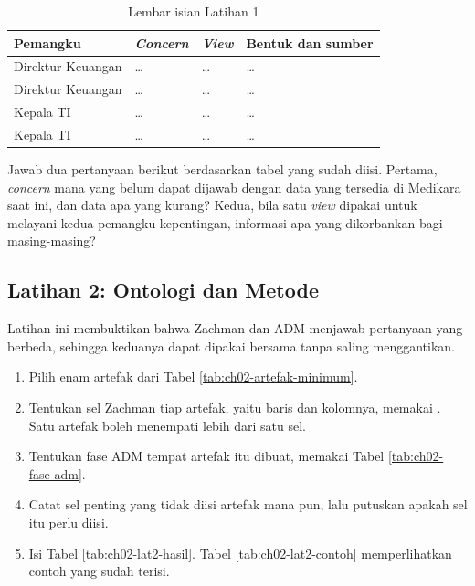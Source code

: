 \begin{table}[!htb]
  \centering
  \caption{Lembar isian Latihan 1}
  \label{tab:ch02-lat1-hasil}
  {\footnotesize
  \begin{tabularx}{\textwidth}{>{\raggedright\arraybackslash}p{2.0cm}
                               >{\raggedright\arraybackslash}X
                               >{\raggedright\arraybackslash}p{2.8cm}
                               >{\raggedright\arraybackslash}p{2.8cm}}
    \hline
    \textbf{Pemangku} & \textbf{\textit{Concern}} & \textbf{\textit{View}} & \textbf{Bentuk dan sumber} \\
    \hline
    Direktur Keuangan & \dots & \dots & \dots \\
    \hline
    Direktur Keuangan & \dots & \dots & \dots \\
    \hline
    Kepala TI & \dots & \dots & \dots \\
    \hline
    Kepala TI & \dots & \dots & \dots \\
    \hline
  \end{tabularx}}
\end{table}

Jawab dua pertanyaan berikut berdasarkan tabel yang sudah diisi. Pertama,
\textit{concern} mana yang belum dapat dijawab dengan data yang tersedia di
Medikara saat ini, dan data apa yang kurang? Kedua, bila satu \textit{view}
dipakai untuk melayani kedua pemangku kepentingan, informasi apa yang
dikorbankan bagi masing-masing?

\subsection*{Latihan 2: Ontologi dan Metode}

Latihan ini membuktikan bahwa Zachman dan ADM menjawab pertanyaan yang
berbeda, sehingga keduanya dapat dipakai bersama tanpa saling menggantikan.

\begin{enumerate}
  \item Pilih enam artefak dari Tabel \ref{tab:ch02-artefak-minimum}.
  \item Tentukan sel Zachman tiap artefak, yaitu baris dan kolomnya, memakai
        . Satu artefak
        boleh menempati lebih dari satu sel.
  \item Tentukan fase ADM tempat artefak itu dibuat, memakai
        Tabel \ref{tab:ch02-fase-adm}.
  \item Catat sel penting yang tidak diisi artefak mana pun, lalu putuskan
        apakah sel itu perlu diisi.
  \item Isi Tabel \ref{tab:ch02-lat2-hasil}. Tabel \ref{tab:ch02-lat2-contoh}
        memperlihatkan contoh yang sudah terisi.
\end{enumerate}

